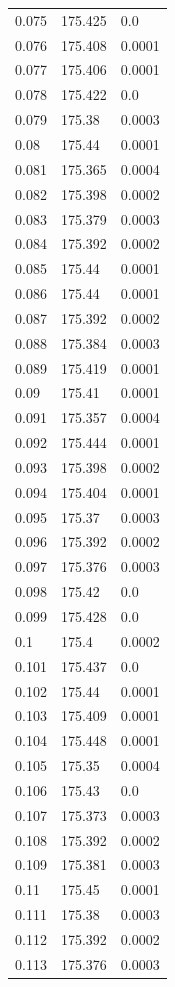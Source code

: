 \begin{table}[H]
\begin{tabular}{lll}
0.075 & 175.425 & 0.0 \\
0.076 & 175.408 & 0.0001 \\
0.077 & 175.406 & 0.0001 \\
0.078 & 175.422 & 0.0 \\
0.079 & 175.38 & 0.0003 \\
0.08 & 175.44 & 0.0001 \\
0.081 & 175.365 & 0.0004 \\
0.082 & 175.398 & 0.0002 \\
0.083 & 175.379 & 0.0003 \\
0.084 & 175.392 & 0.0002 \\
0.085 & 175.44 & 0.0001 \\
0.086 & 175.44 & 0.0001 \\
0.087 & 175.392 & 0.0002 \\
0.088 & 175.384 & 0.0003 \\
0.089 & 175.419 & 0.0001 \\
0.09 & 175.41 & 0.0001 \\
0.091 & 175.357 & 0.0004 \\
0.092 & 175.444 & 0.0001 \\
0.093 & 175.398 & 0.0002 \\
0.094 & 175.404 & 0.0001 \\
0.095 & 175.37 & 0.0003 \\
0.096 & 175.392 & 0.0002 \\
0.097 & 175.376 & 0.0003 \\
0.098 & 175.42 & 0.0 \\
0.099 & 175.428 & 0.0 \\
0.1 & 175.4 & 0.0002 \\
0.101 & 175.437 & 0.0 \\
0.102 & 175.44 & 0.0001 \\
0.103 & 175.409 & 0.0001 \\
0.104 & 175.448 & 0.0001 \\
0.105 & 175.35 & 0.0004 \\
0.106 & 175.43 & 0.0 \\
0.107 & 175.373 & 0.0003 \\
0.108 & 175.392 & 0.0002 \\
0.109 & 175.381 & 0.0003 \\
0.11 & 175.45 & 0.0001 \\
0.111 & 175.38 & 0.0003 \\
0.112 & 175.392 & 0.0002 \\
0.113 & 175.376 & 0.0003 \\

\end{tabular}
\end{table}
